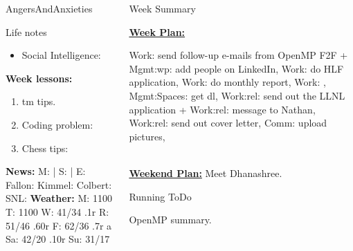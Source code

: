 \begin{columns}
\begin{column}{0.10\linewidth}
\begin{block}{AngersAndAnxieties}
\begin{itemize}
      \end{itemize}
    \end{block}
      \begin{block}{Life notes}
        \begin{itemize}
          \tiny \item \tiny Social Intelligence: 
        \end{itemize}
      \end{block}
      \begin{block}
        {\tiny {\bf Week lessons:}}
        \begin{enumerate}
        \item \tiny tm tips.
        \item \tiny Coding problem: 
        \item \tiny Chess tips: 
        \end{enumerate}
            {{\tiny {\tiny \bf  News:}} {\tiny  M:  | S: 
                | E: Fallon:  Kimmel:  Colbert: SNL:}}
            {{\tiny {\tiny \bf  Weather:}} {\tiny M: 1100 T: 1100 W: 41/34 .1r 
                 R: 51/46 .60r F: 62/36 .7r a Sa: 42/20 .10r Su: 31/17 }} 

      \end{block}
  \end{column}
  \begin{column}{0.6\linewidth}
    \begin{block}{Week Summary}
      {\underline {\bf Week Plan:} 

        Work: send follow-up e-mails from OpenMP F2F + Mgmt:wp: add
        people on LinkedIn,  Work: do HLF
        application, Work: do monthly report, Work: ,  Mgmt:Spaces: get dl, Work:rel: send out the LLNL application + Work:rel:
        message to Nathan, Work:rel: send out cover letter, Comm: upload pictures,
 }\\

{\underline{\bf Weekend Plan:} Meet Dhanashree.} \\  

    \end{block}
    \begin{block}{Running ToDo} %
      \begin{enumerate}



        OpenMP summary.   


\end{enumerate}
\end{block}
\end{column}
\end{columns}
